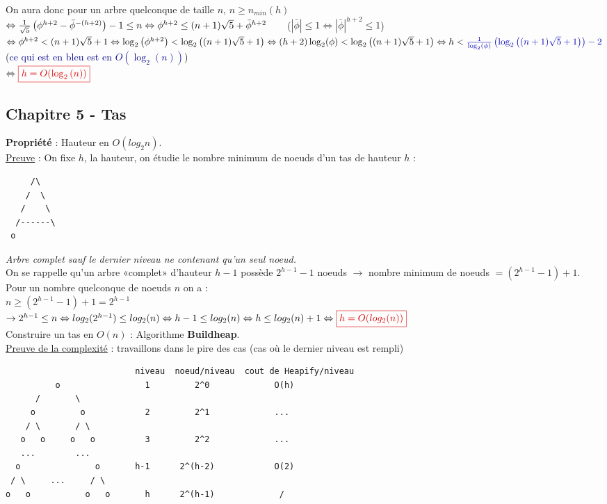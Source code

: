 \documentclass{article}
\newcommand{\blu}[1]{\textcolor{darkblue}{#1}}
\newcommand{\red}[1]{\textcolor{darkred}{#1}}
\begin{document}
On aura donc pour un arbre quelconque de taille $n$, $n \geq n_{min}(h)$ \\
$\Leftrightarrow \frac{1}{\sqrt{5}}\left(\phi^{h+2}-\bar{\phi}^{-(h+2)}\right) - 1 \leq n \\
\Leftrightarrow \phi^{h+2} \leq (n+1) \sqrt{5} + \bar{\phi}^{h+2}\ \ \ \ \ $ ($|\bar{\phi}| \leq 1 
\Leftrightarrow |\bar{\phi}|^{h+2} \leq 1$) \\
$\Leftrightarrow \phi^{h+2} < (n+1) \sqrt{5} + 1 \\ 
\Leftrightarrow \log_2{\left(\phi^{h+2}\right)} < \log_2{\left((n+1) \sqrt{5} + 1\right)} \\
\Leftrightarrow (h+2) \log_2(\phi) < \log_2{\left((n+1) \sqrt{5} + 1\right)} \\
\Leftrightarrow h < \blu{\frac{1}{\log_2(\phi)} \left(\log_2{\left((n+1) \sqrt{5} + 1\right)}\right) - 2}$
(\blu{ce qui est en bleu est en $O(\log_2(n))$}) \\
$\Leftrightarrow \red{\boxed{h = O(\log_2{(n)})}}$
\subsection{Chapitre 5 - Tas}

\noindent\textbf{Propriété} : Hauteur en $O(log_2n)$.\\
\underline{Preuve} : On fixe $h$, la hauteur, on étudie le nombre minimum de noeuds d'un tas de hauteur $h$ :
\begin{lstlisting}
     /\
    /  \
   /    \
  /------\
 o
\end{lstlisting}
\textit{Arbre complet sauf le dernier niveau ne contenant qu'un seul noeud.}\\
On se rappelle qu'un arbre «complet» d'hauteur $h-1$ possède $2^{h-1}-1$ noeuds $\rightarrow$ nombre minimum de 
noeuds $ = (2^{h-1} - 1) + 1$. Pour un nombre quelconque de noeuds $n$ on a : \\
$n \geq (2^{h-1}-1) + 1 = 2^{h-1}$ \\
$\rightarrow 2^{h-1} \leq n \\
\Leftrightarrow log_2{(2^{h-1})} \leq log_2{(n)} \\
\Leftrightarrow h-1 \leq log_2{(n)} \\
\Leftrightarrow h \leq log_2{(n)} + 1 \\
\Leftrightarrow \red{\boxed{h = O(log_2{(n)})}}$ \\

\noindent Construire un tas en $O(n)$ : Algorithme \textbf{Buildheap}.\\
\newpage
\underline{Preuve de la complexité} : travaillons dans le pire des cas (cas où le dernier niveau est rempli)
\begin{lstlisting}
                          niveau  noeud/niveau  cout de Heapify/niveau                 
          o                 1         2^0             O(h)
      /       \ 
     o         o            2         2^1             ...
    / \       / \
   o   o     o   o          3         2^2             ...
   ...        ...
  o               o       h-1      2^(h-2)            O(2)
 / \     ...     / \
o   o           o   o       h      2^(h-1)             /
\end{lstlisting}
\end{document}
